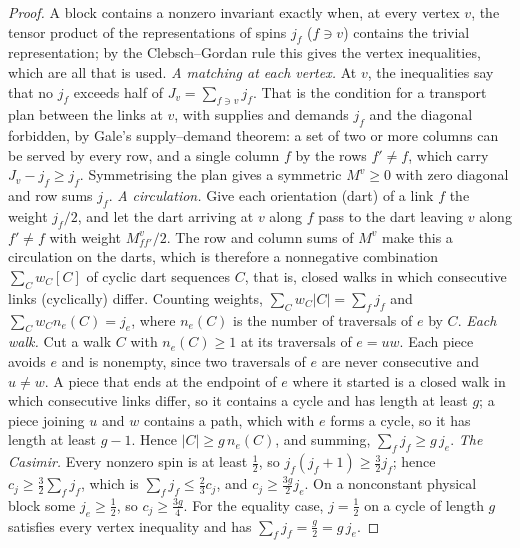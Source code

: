 \begin{proof}
A block contains a nonzero invariant exactly when, at every vertex $v$, the tensor product of the representations of spins $j_f$ ($f\ni v$) contains the trivial representation; by the Clebsch--Gordan rule this gives the vertex inequalities, which are all that is used.
\emph{A matching at each vertex.} At $v$, the inequalities say that no $j_f$ exceeds half of $J_v=\sum_{f\ni v}j_f$. That is the condition for a transport plan between the links at $v$, with supplies and demands $j_f$ and the diagonal forbidden, by Gale's supply--demand theorem: a set of two or more columns can be served by every row, and a single column $f$ by the rows $f'\ne f$, which carry $J_v-j_f\ge j_f$. Symmetrising the plan gives a symmetric $M^v\ge0$ with zero diagonal and row sums $j_f$.
\emph{A circulation.} Give each orientation (dart) of a link $f$ the weight $j_f/2$, and let the dart arriving at $v$ along $f$ pass to the dart leaving $v$ along $f'\ne f$ with weight $M^v_{ff'}/2$. The row and column sums of $M^v$ make this a circulation on the darts, which is therefore a nonnegative combination $\sum_Cw_C[C]$ of cyclic dart sequences $C$, that is, closed walks in which consecutive links (cyclically) differ. Counting weights, $\sum_Cw_C|C|=\sum_fj_f$ and $\sum_Cw_Cn_e(C)=j_e$, where $n_e(C)$ is the number of traversals of $e$ by $C$.
\emph{Each walk.} Cut a walk $C$ with $n_e(C)\ge1$ at its traversals of $e=uw$. Each piece avoids $e$ and is nonempty, since two traversals of $e$ are never consecutive and $u\ne w$. A piece that ends at the endpoint of $e$ where it started is a closed walk in which consecutive links differ, so it contains a cycle and has length at least $g$; a piece joining $u$ and $w$ contains a path, which with $e$ forms a cycle, so it has length at least $g-1$. Hence $|C|\ge g\,n_e(C)$, and summing, $\sum_fj_f\ge g\,j_e$.
\emph{The Casimir.} Every nonzero spin is at least $\frac12$, so $j_f(j_f+1)\ge\frac32j_f$; hence $c_j\ge\frac32\sum_fj_f$, which is $\sum_fj_f\le\frac23c_j$, and $c_j\ge\frac{3g}2j_e$. On a nonconstant physical block some $j_e\ge\frac12$, so $c_j\ge\frac{3g}4$. For the equality case, $j=\frac12$ on a cycle of length $g$ satisfies every vertex inequality and has $\sum_fj_f=\frac g2=g\,j_e$.
\end{proof}

